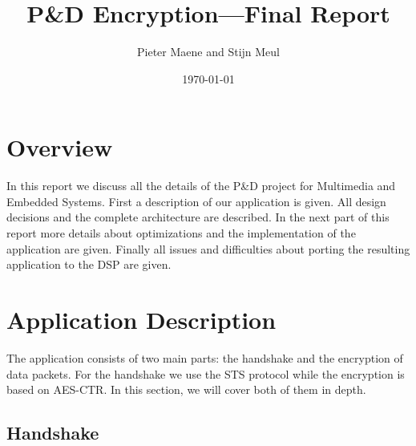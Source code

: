 \documentclass[a4paper]{article}
\title{P\&D Encryption---Final Report}
\author{Pieter Maene and Stijn Meul}
\date{\today}
\begin{document}

\maketitle

\section{Overview}
In this report we discuss all the details of the P\&D project for Multimedia and Embedded Systems. First a description of our application is given. All design decisions and the complete architecture are described. In the next part of this report more details about optimizations and the implementation of the application are given. Finally all issues and difficulties about porting the resulting application to the DSP are given.

\section{Application Description}

The application consists of two main parts: the handshake and the encryption of data packets. For the handshake we use the STS protocol while the encryption is based on AES-CTR. In this section, we will cover both of them in depth.

\subsection{Handshake}
\end{document}
